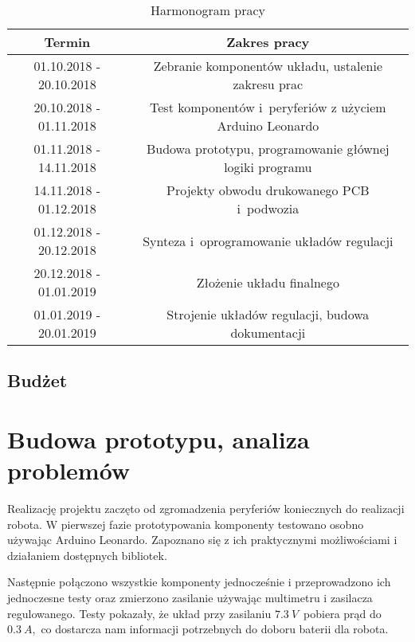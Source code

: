 \documentclass[11pt]{article}
\begin{document}
\begin{table}[hbt]
	\centering
	\label{tab:schedule}
		\begin{tabular}{|c|c|}
	\hline
Termin                  & Zakres pracy                                                                         \\ \hline
01.10.2018 - 20.10.2018 & Zebranie komponentów układu, ustalenie zakresu prac                                  \\ \hline
20.10.2018 - 01.11.2018 & Test komponentów i~peryferiów z użyciem Arduino Leonardo                             \\ \hline
01.11.2018 - 14.11.2018 & Budowa prototypu, programowanie głównej logiki programu \\ \hline
14.11.2018 - 01.12.2018 & Projekty obwodu drukowanego PCB i~podwozia                                           \\ \hline
01.12.2018 - 20.12.2018 & Synteza i~oprogramowanie układów regulacji                                           \\ \hline
20.12.2018 - 01.01.2019 & Złożenie układu finalnego                                                            \\ \hline
01.01.2019 - 20.01.2019 & Strojenie układów regulacji, budowa dokumentacji                                      \\ \hline
\end{tabular}
	\caption{Harmonogram pracy}
\end{table}

\subsection{Budżet}

\section{Budowa prototypu, analiza problemów}
Realizację projektu zaczęto od zgromadzenia peryferiów koniecznych do realizacji robota.
W pierwszej fazie prototypowania komponenty testowano osobno używając Arduino Leonardo. Zapoznano się z ich praktycznymi możliwościami i działaniem dostępnych bibliotek. 

Następnie połączono wszystkie komponenty jednocześnie i przeprowadzono ich jednoczesne testy oraz zmierzono zasilanie używając multimetru i zasilacza regulowanego.
Testy pokazały, że układ przy zasilaniu $ 7.3 \ V $~pobiera prąd do $ 0.3 \ A $,~co dostarcza nam informacji potrzebnych do doboru baterii dla robota.
\end{document}
